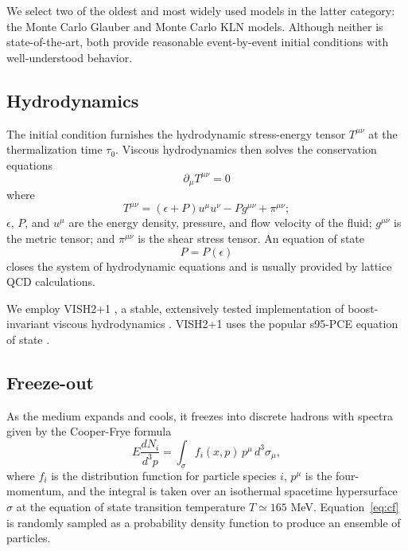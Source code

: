 \documentclass[aps,prc,reprint,amsmath]{revtex4-1}
\begin{document}
We select two of the oldest and most widely used models in the latter category:
the Monte Carlo Glauber \cite{Miller:2007ri} and Monte Carlo KLN \cite{Drescher:2006pi} models.
Although neither is state-of-the-art, both provide reasonable event-by-event initial conditions with well-understood behavior.

\subsection{Hydrodynamics}

The initial condition furnishes the hydrodynamic stress-energy tensor $T^{\mu\nu}$ at the thermalization time $\tau_0$.
Viscous hydrodynamics then solves the conservation equations
\begin{equation}
  \partial_\mu T^{\mu\nu} = 0
\end{equation}
where
\begin{equation}
  T^{\mu\nu} = (\epsilon + P) u^\mu u^\nu - P g^{\mu\nu} + \pi^{\mu\nu};
\end{equation}
$\epsilon$, $P$, and $u^\mu$ are the energy density, pressure, and flow velocity of the fluid; $g^{\mu\nu}$ is the metric tensor; and $\pi^{\mu\nu}$ is the shear stress tensor.
An equation of state
\begin{equation}
  P = P(\epsilon)
\end{equation}
closes the system of hydrodynamic equations and is usually provided by lattice QCD calculations.

We employ VISH2+1 \cite{Song:2007ux}, a stable, extensively tested implementation of boost-invariant viscous hydrodynamics \cite{Bjorken:1982qr}.
VISH2+1 uses the popular s95-PCE equation of state \cite{Huovinen:2009yb}.

\subsection{Freeze-out}

As the medium expands and cools, it freezes into discrete hadrons with spectra given by the Cooper-Frye formula \cite{Cooper:1974mv}
\begin{equation}
  E \frac{dN_i}{d^3p} = \int_\sigma f_i(x,p) \, p^\mu \, d^3\sigma_\mu,
  \label{eq:cf}
\end{equation}
where $f_i$ is the distribution function for particle species $i$, $p^\mu$ is the four-momentum, and the integral is taken over an isothermal spacetime hypersurface $\sigma$ at the equation of state transition temperature $T \simeq 165$ MeV.
Equation~\eqref{eq:cf} is randomly sampled as a probability density function to produce an ensemble of particles.
\end{document}
